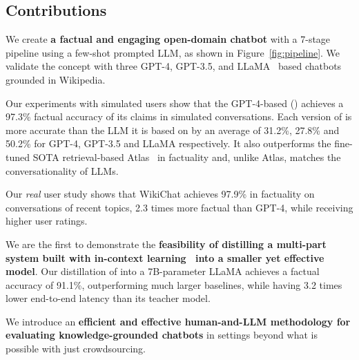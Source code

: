 \subsection{Contributions}
We create {\bf a factual and engaging open-domain chatbot} with a 7-stage pipeline using a few-shot prompted LLM, as shown in Figure~\ref{fig:pipeline}.
    We validate the concept with three GPT-4, GPT-3.5, and LLaMA~\cite{touvron2023llama} based chatbots grounded in Wikipedia.
    
    Our experiments with simulated users show that the GPT-4-based \system (\systemgf) achieves a 97.3\% factual accuracy of its claims in simulated conversations. Each version of \system is more accurate than the LLM it is based on by an average of 31.2\%, 27.8\% and 50.2\% for GPT-4, GPT-3.5 and LLaMA respectively.   
    It also outperforms the fine-tuned SOTA retrieval-based Atlas~\cite{izacard2022atlas} in factuality and, unlike Atlas, matches the conversationality of LLMs. 
    
Our {\em real} user study shows that WikiChat achieves 97.9\% in factuality on conversations of recent topics, 
2.3 times more factual than GPT-4, while receiving  higher user ratings.

We are the first to demonstrate the {\bf feasibility of distilling a multi-part system built with in-context learning~\cite{brown2020language} into a smaller yet effective model}. Our distillation of \systemgf into a 7B-parameter LLaMA achieves a factual accuracy of 91.1\%, outperforming much larger baselines, while having 3.2 times lower end-to-end latency than its teacher model.

We introduce an {\bf efficient and effective human-and-LLM methodology for evaluating knowledge-grounded chatbots} in settings beyond what is possible with just crowdsourcing.